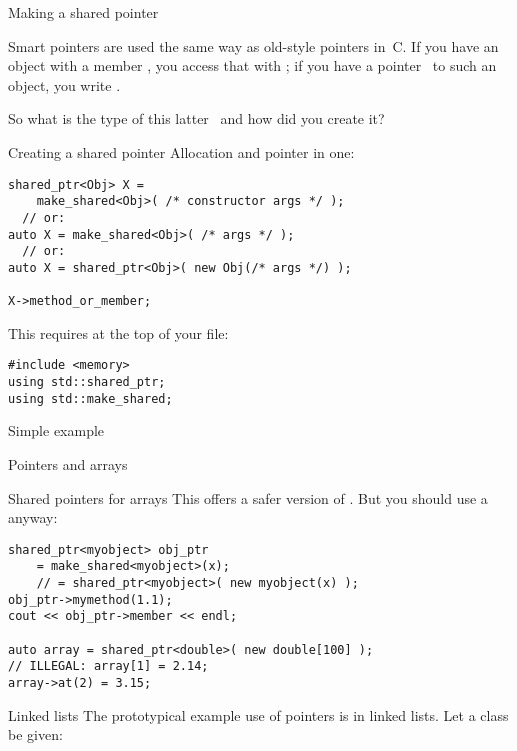  {Making a shared pointer}
\label{sec:shared_ptr}

Smart pointers are used the same way as old-style pointers in~C.
If you have an
object  with a member , you access that with ; if you
have a pointer~ to such an object, you write .

So what is the type of this latter~ and how did you create it?

\begin{block}{Creating a shared pointer}
  \label{sl:make-shared}
  Allocation and pointer in one:
\begin{lstlisting}
shared_ptr<Obj> X =
    make_shared<Obj>( /* constructor args */ );
  // or:
auto X = make_shared<Obj>( /* args */ );
  // or:
auto X = shared_ptr<Obj>( new Obj(/* args */) );

X->method_or_member;
\end{lstlisting}
\end{block}

This requires at the top of your file:
\begin{lstlisting}
#include <memory>
using std::shared_ptr;
using std::make_shared;
\end{lstlisting}

\begin{block}{Simple example}
  \label{sl:shared-ptr}
\end{block}

 {Pointers and arrays}

\begin{slide}{Shared pointers for arrays}
This offers a safer version of . But you should use a
 anyway:
\begin{lstlisting}
shared_ptr<myobject> obj_ptr
    = make_shared<myobject>(x);
    // = shared_ptr<myobject>( new myobject(x) );
obj_ptr->mymethod(1.1);
cout << obj_ptr->member << endl;

auto array = shared_ptr<double>( new double[100] );
// ILLEGAL: array[1] = 2.14;
array->at(2) = 3.15;
\end{lstlisting}
\end{slide}

\begin{block}{Linked lists}
  \label{sl:linkedlistimpl}
  The prototypical example use of pointers is in linked lists. Let a
  class  be given:
  \begin{multicols}{2}
    \columnbreak
    \vfill\hbox{}
  \end{multicols}
\end{block}

